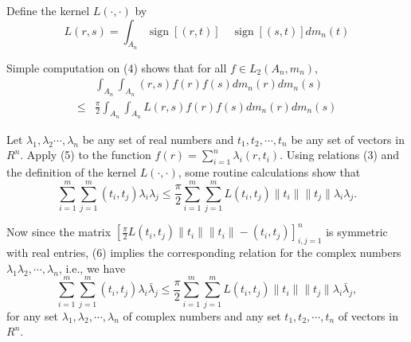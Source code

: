 \documentclass{article}
\begin{document}
Define the kernel $L(\cdot, \cdot)$ by
\begin{equation}
L(r, s)=\int_{A_{n}} \operatorname{sign}[(r, t)] \quad \operatorname{sign}[(s, t)] d m_{n}(t)
\end{equation}

Simple computation on (4) shows that for all $f \in L_{2}(A_{n}, m_{n})$,
\begin{equation}
\begin{aligned}
& \int_{A_{n}} \int_{A_{n}}(r, s) f(r) f(s) d m_{n}(r) d m_{n}(s) \\
\leq & \frac{\pi}{2} \int_{A_{n}} \int_{A_{n}} L(r, s) f(r) f(s) d m_{n}(r) d m_{n}(s)
\end{aligned}
\end{equation}

Let $\lambda_{1}, \lambda_{2} \cdots, \lambda_{n}$ be any set of real numbers and $t_{1}, t_{2}, \cdots, t_{n}$ be any set of vectors in $R^{n}$. Apply (5) to the function $f(r)=\sum_{i=1}^{n} \lambda_{i}(r, t_{i})$. Using relations (3) and the definition of the kernel $L(\cdot, \cdot)$, some routine calculations show that
\begin{equation}
\sum_{i=1}^{m} \sum_{j=1}^{m}(t_{i}, t_{j}) \lambda_{i} \lambda_{j} \leq \frac{\pi}{2} \sum_{i=1}^{m} \sum_{j=1}^{m} L(t_{i}, t_{j})\|t_{i}\|\|t_{j}\| \lambda_{i} \lambda_{j}.
\end{equation}

Now since the matrix $[\frac{\pi}{2} L(t_{i}, t_{j})\|t_{i}\|\|t_{i}\|-(t_{i}, t_{j})]_{i, j=1}^{n}$ is symmetric with real entries, (6) implies the corresponding relation for the complex numbers $\lambda_{1} \lambda_{2}, \cdots, \lambda_{n}$, i.e., we have
\begin{equation}
\sum_{i=1}^{m} \sum_{j=1}^{m}(t_{i}, t_{j}) \lambda_{i} \bar{\lambda}_{j} \leq \frac{\pi}{2} \sum_{i=1}^{m} \sum_{j=1}^{m} L(t_{i}, t_{j})\|t_{i}\|\|t_{j}\| \lambda_{i} \bar{\lambda}_{j},
\end{equation}
for any set $\lambda_{1}, \lambda_{2}, \cdots, \lambda_{n}$ of complex numbers and any set $t_{1}, t_{2}, \cdots, t_{n}$ of vectors in $R^{n}$.
\end{document}
